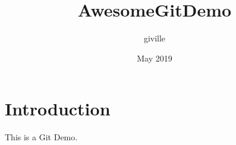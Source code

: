 \documentclass{article}
\title{AwesomeGitDemo}
\author{giville }
\date{May 2019}
\begin{document}
\maketitle

\section{Introduction}


This is a Git Demo.
\end{document}
